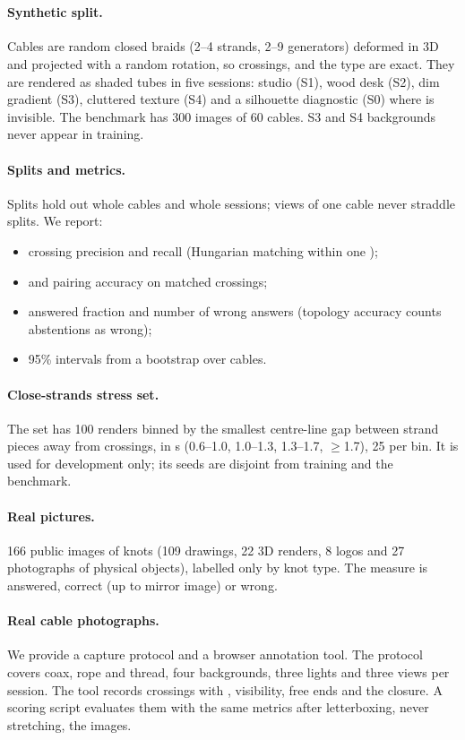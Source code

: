 \section{\bench}\label{sec:bench}

\paragraph{Synthetic split.} Cables are random closed braids (2--4 strands, 2--9
generators) deformed in 3D and projected with a random rotation, so crossings, \ou{}
and the type are exact. They are rendered as shaded tubes in five sessions:
studio (S1), wood desk (S2), dim gradient (S3), cluttered texture (S4) and a
silhouette diagnostic (S0) where \ou{} is invisible. The benchmark has 300 images of
60 cables. S3 and S4 backgrounds never appear in training.

\paragraph{Splits and metrics.} Splits hold out whole cables and whole sessions;
views of one cable never straddle splits. We report:
\begin{itemize}
\item crossing precision and recall (Hungarian matching within one \cw);
\item \ou{} and pairing accuracy on matched crossings;
\item answered fraction and number of wrong answers (topology accuracy counts
  abstentions as wrong);
\item 95\% intervals from a bootstrap over cables.
\end{itemize}

\paragraph{Close-strands stress set.} The set has 100 renders binned by the smallest
centre-line gap between strand pieces away from crossings, in \cw s (0.6--1.0,
1.0--1.3, 1.3--1.7, $\ge$1.7), 25 per bin. It is used for development only; its
seeds are disjoint from training and the benchmark.

\paragraph{Real pictures.} 166 public images of knots (109 drawings, 22 3D renders,
8 logos and 27 photographs of physical objects), labelled only by knot type. The
measure is answered, correct (up to mirror image) or wrong.

\paragraph{Real cable photographs.} We provide a capture protocol and a browser
annotation tool. The protocol covers coax, rope and thread, four backgrounds, three
lights and three views per session. The tool records crossings with \ou{},
visibility, free ends and the closure. A scoring script evaluates them with the same
metrics after letterboxing, never stretching, the images.
